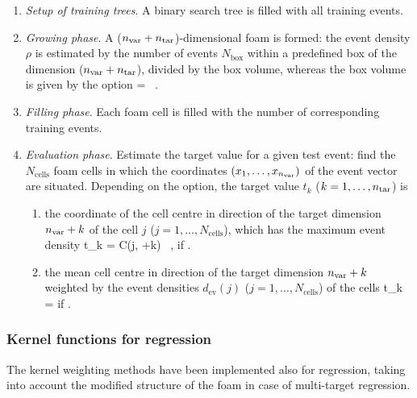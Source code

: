 \begin{enumerate}
  \item \emph{Setup of training trees}. A binary search tree is filled
        with all training events.

  \item \emph{Growing phase}. A (${n_\text{var}}+n_\text{tar}$)-dimensional
        foam is formed: the event density $\rho$ is estimated by the
        number of events $N_\text{box}$ within a predefined box of the
        dimension (${n_\text{var}}+n_\text{tar}$), divided by the box volume,
        whereas the box volume is given by the  option
	\beq
        \rho =  \, .
	\eeq

  \item \emph{Filling phase}. Each foam cell is filled with the
        number of corresponding training events.

  \item \emph{Evaluation phase}. Estimate the target value for a
        given test event: find the $N_\text{cells}$ foam cells in
        which the coordinates $(x_1, \ldots, x_{n_\text{var}})$ of the event
        vector are situated.  Depending on the 
        option, the target value $t_k$ ($k=1, \ldots, {n_\text{tar}}$) is
	\begin{enumerate}
	  \item the coordinate of the cell centre in direction of the
	        target dimension ${n_\text{var}}+k$ of the cell $j$ ($j=1,
	        \ldots, N_\text{cells}$), which has the maximum event
	        density
		\beq
		  t_k  = C(j, \Nvar+k) \, ,
		\eeq
		if .
	  \item the mean cell centre in direction of the target
	        dimension ${n_\text{var}}+k$ weighted by the event densities
	        $d_\text{ev}(j)$ ($j=1, \ldots, N_\text{cells}$) of
	        the cells
		\beq
		  t_k = 
		\eeq
		if .  
	\end{enumerate}
\end{enumerate}


\subsubsection*{Kernel functions for regression}

The kernel weighting methods have been implemented also for regression,
taking into account the modified structure of the foam in case 
of multi-target regression.


